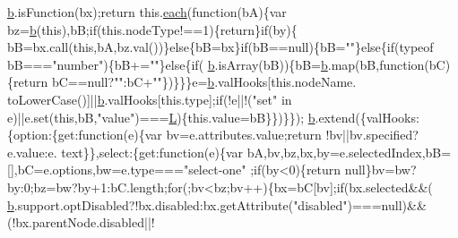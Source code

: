 \begin{DoxyCode}
      \hyperlink{docs_2_programmer's_manual_2html_2jquery_8js_aa4026ad5544b958e54ce5e106fa1c805}{b}.isFunction(bx);\textcolor{keywordflow}{return} this.\hyperlink{docs_2_programmer's_manual_2html_2jquery_8js_a871ff39db627c54c710a3e9909b8234c}{each}(\textcolor{keyword}{function}(bA)\{var bz=\hyperlink{docs_2_programmer's_manual_2html_2jquery_8js_aa4026ad5544b958e54ce5e106fa1c805}{b}(\textcolor{keyword}{this}),bB;\textcolor{keywordflow}{if}(this.nodeType!==1)\{\textcolor{keywordflow}{return}\}\textcolor{keywordflow}{if}(by)\{
      bB=bx.call(\textcolor{keyword}{this},bA,bz.val())\}\textcolor{keywordflow}{else}\{bB=bx\}\textcolor{keywordflow}{if}(bB==null)\{bB=\textcolor{stringliteral}{""}\}\textcolor{keywordflow}{else}\{\textcolor{keywordflow}{if}(typeof bB===\textcolor{stringliteral}{"number"})\{bB+=\textcolor{stringliteral}{""}\}\textcolor{keywordflow}{else}\{\textcolor{keywordflow}{if}(
      \hyperlink{docs_2_programmer's_manual_2html_2jquery_8js_aa4026ad5544b958e54ce5e106fa1c805}{b}.isArray(bB))\{bB=\hyperlink{docs_2_programmer's_manual_2html_2jquery_8js_aa4026ad5544b958e54ce5e106fa1c805}{b}.map(bB,\textcolor{keyword}{function}(bC)\{\textcolor{keywordflow}{return} bC==null?\textcolor{stringliteral}{""}:bC+\textcolor{stringliteral}{""}\})\}\}\}e=\hyperlink{docs_2_programmer's_manual_2html_2jquery_8js_aa4026ad5544b958e54ce5e106fa1c805}{b}.valHooks[\textcolor{keyword}{this}.nodeName.
      toLowerCase()]||\hyperlink{docs_2_programmer's_manual_2html_2jquery_8js_aa4026ad5544b958e54ce5e106fa1c805}{b}.valHooks[this.type];\textcolor{keywordflow}{if}(!e||!(\textcolor{stringliteral}{"set"} in e)||e.set(\textcolor{keyword}{this},bB,\textcolor{stringliteral}{"value"})===\hyperlink{docs_2_programmer's_manual_2html_2jquery_8js_a38ee4c0b5f4fe2a18d0c783af540d253}{L})\{this.value=bB\}\})\}\});
      \hyperlink{docs_2_programmer's_manual_2html_2jquery_8js_aa4026ad5544b958e54ce5e106fa1c805}{b}.extend(\{valHooks:\{option:\{\textcolor{keyword}{get}:\textcolor{keyword}{function}(e)\{var bv=e.attributes.value;\textcolor{keywordflow}{return} !bv||bv.specified?e.value:e.
      text\}\},select:\{\textcolor{keyword}{get}:\textcolor{keyword}{function}(e)\{var bA,bv,bz,bx,by=e.selectedIndex,bB=[],bC=e.options,bw=e.type===\textcolor{stringliteral}{"select-one"}
      ;\textcolor{keywordflow}{if}(by<0)\{\textcolor{keywordflow}{return} null\}bv=bw?by:0;bz=bw?by+1:bC.length;\textcolor{keywordflow}{for}(;bv<bz;bv++)\{bx=bC[bv];\textcolor{keywordflow}{if}(bx.selected&&(
      \hyperlink{docs_2_programmer's_manual_2html_2jquery_8js_aa4026ad5544b958e54ce5e106fa1c805}{b}.support.optDisabled?!bx.disabled:bx.getAttribute(\textcolor{stringliteral}{"disabled"})===null)&&(!bx.parentNode.disabled||!

\end{DoxyCode}
